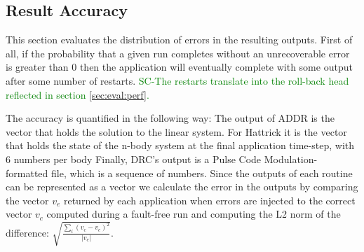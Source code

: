 \documentclass[10pt, conference, compsocconf]{IEEEtran}
\newcommand{\sui}[1]{%
  \textcolor{green}{SC-#1}
}
\begin{document}



\vspace{-10pt}
\subsection{Result Accuracy}
\vspace{-10pt}
\label{sec:eval:acc}


This section evaluates the distribution of errors in the resulting outputs.
First of all, if the probability that a given run completes without an unrecoverable error is greater than 0 then the application will eventually complete with some output after some number of restarts. \sui{The restarts translate into the roll-back head reflected in section \ref{sec:eval:perf}.}

The accuracy is quantified in the following way:
The output of ADDR is the vector that holds the solution to the linear system.
For Hattrick it is the vector that holds the state of the n-body system at the final application time-step, with 6 numbers per body
Finally, DRC's output is a Pulse Code Modulation-formatted file, which is a sequence of numbers.
Since the outputs of each routine can be represented as a vector we calculate the error in the outputs by comparing the vector $v_e$ returned by each application when errors are injected to the correct vector $v_c$ computed during a fault-free run and computing the L2 norm of the difference: $\sqrt{\frac{\sum_{i} (v_c-v_e)^2}{\left| v_c \right|}}$.
\end{document}
